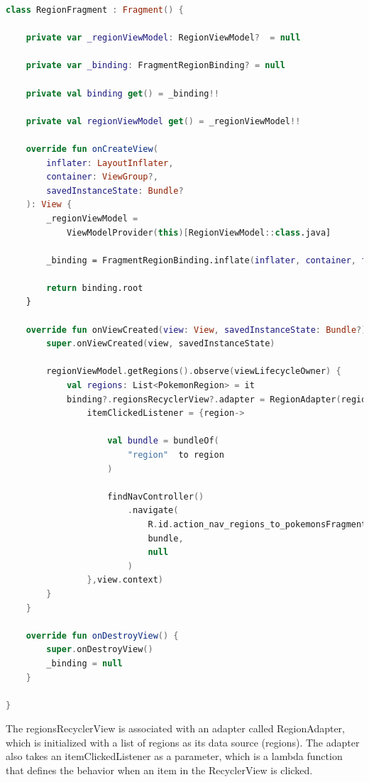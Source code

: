 \documentclass[a4paper, 12pt]{article}
\begin{document}
\begin{lstlisting}[caption={Region Fragment to suport navigation code.}, label={code:code_region_fragment_nav}, language=Kotlin]
    class RegionFragment : Fragment() {

    private var _regionViewModel: RegionViewModel?  = null

    private var _binding: FragmentRegionBinding? = null

    private val binding get() = _binding!!

    private val regionViewModel get() = _regionViewModel!!

    override fun onCreateView(
        inflater: LayoutInflater,
        container: ViewGroup?,
        savedInstanceState: Bundle?
    ): View {
        _regionViewModel =
            ViewModelProvider(this)[RegionViewModel::class.java]

        _binding = FragmentRegionBinding.inflate(inflater, container, false)

        return binding.root
    }

    override fun onViewCreated(view: View, savedInstanceState: Bundle?) {
        super.onViewCreated(view, savedInstanceState)

        regionViewModel.getRegions().observe(viewLifecycleOwner) {
            val regions: List<PokemonRegion> = it
            binding?.regionsRecyclerView?.adapter = RegionAdapter(regions,
                itemClickedListener = {region->

                    val bundle = bundleOf(
                        "region"  to region
                    )

                    findNavController()
                        .navigate(
                            R.id.action_nav_regions_to_pokemonsFragment,
                            bundle,
                            null
                        )
                },view.context)
        }
    }

    override fun onDestroyView() {
        super.onDestroyView()
        _binding = null
    }

}
\end{lstlisting}

The regionsRecyclerView is associated with an adapter called RegionAdapter, which is initialized with a list of regions as its data source (regions). 
The adapter also takes an itemClickedListener as a parameter, which is a lambda function that defines the behavior when an item in the RecyclerView is clicked.
\end{document}
